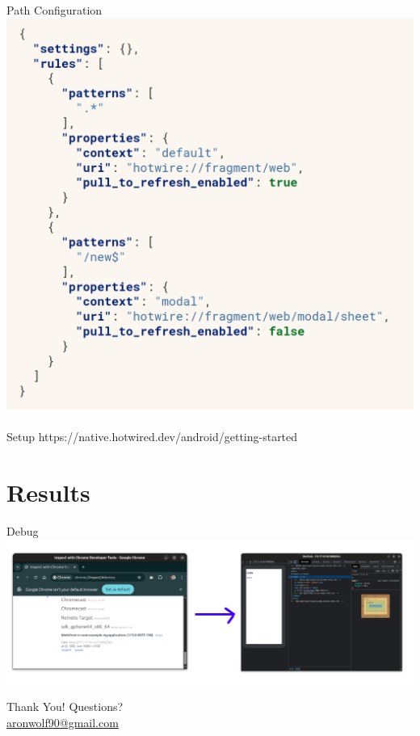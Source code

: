 \documentclass{beamer}
\begin{document}
\begin{frame}{Path Configuration}
  \centering
  \includegraphics[width=0.8\linewidth]{images/path-configuration.png}
\end{frame}

\begin{frame}{Setup}
  https://native.hotwired.dev/android/getting-started
\end{frame}

\section{Results}

\begin{frame}{Debug}
  \centering
  \includegraphics[width=1\linewidth]{images/debug.png}
\end{frame}


\begin{frame}{Thank You!}
  \centering
  \Large Questions? \\
  \vspace{1cm}
  \normalsize
  \href{your.email@example.com}{aronwolf90@gmail.com}
\end{frame}
\end{document}
